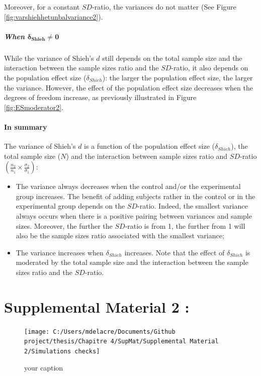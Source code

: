 \documentclass[
  english,
  man,mask]{apa6}
\let\oldparagraph\paragraph
\renewcommand{\paragraph}[1]{\oldparagraph{#1}\mbox{}}
\let\oldsubparagraph\subparagraph
\renewcommand{\subparagraph}[1]{\oldsubparagraph{#1}\mbox{}}
\begin{document}
Moreover, for a constant \(SD\)-ratio, the variances do not matter (See Figure \ref{fig:varshiehhetunbalvariance2}).

\hypertarget{when-bmdelta_shieh-neq-0-2}{%
\subparagraph{\texorpdfstring{When \(\bm{\delta_{Shieh} \neq 0}\)}{When \textbackslash bm\{\textbackslash delta\_\{Shieh\} \textbackslash neq 0\}}}\label{when-bmdelta_shieh-neq-0-2}}

While the variance of Shieh's \(d\) still depends on the total sample size and the interaction between the sample sizes ratio and the \(SD\)-ratio, it also depends on the population effect size (\(\delta_{Shieh}\)): the larger the population effect size, the larger the variance. However, the effect of the population effect size decreases when the degrees of freedom increase, as previously illustrated in Figure \ref{fig:ESmoderator2}.

\hypertarget{in-summary-4}{%
\paragraph{In summary}\label{in-summary-4}}

The variance of Shieh's \(d\) is a function of the population effect size (\(\delta_{Shieh}\)), the total sample size (\(N\)) and the interaction between sample sizes ratio and \(SD\)-ratio \(\left(\frac{n_2}{n_1}\times\frac{\sigma_2}{\sigma_1} \right)\):

\begin{itemize}
\item
  The variance always decreases when the control and/or the experimental group increases. The benefit of adding subjects rather in the control or in the experimental group depends on the \(SD\)-ratio. Indeed, the smallest variance always occurs when there is a positive pairing between variances and sample sizes. Moreover, the further the \(SD\)-ratio is from 1, the further from 1 will also be the sample sizes ratio associated with the smallest variance;
\item
  The variance increases when \(\delta_{Shieh}\) increases. Note that the effect of \(\delta_{Shieh}\) is moderated by the total sample size and the interaction between the sample sizes ratio and the \(SD\)-ratio.
\end{itemize}

\hypertarget{supplemental-material-2}{%
\section{Supplemental Material 2 :}\label{supplemental-material-2}}

\begin{figure}

{\centering \texttt{[image: C:/Users/mdelacre/Documents/Github project/thesis/Chapitre 4/SupMat/Supplemental Material 2/Simulations checks]} 

}

\caption{your caption}\label{fig:unnamed-chunk-1}
\end{figure}
\end{document}
